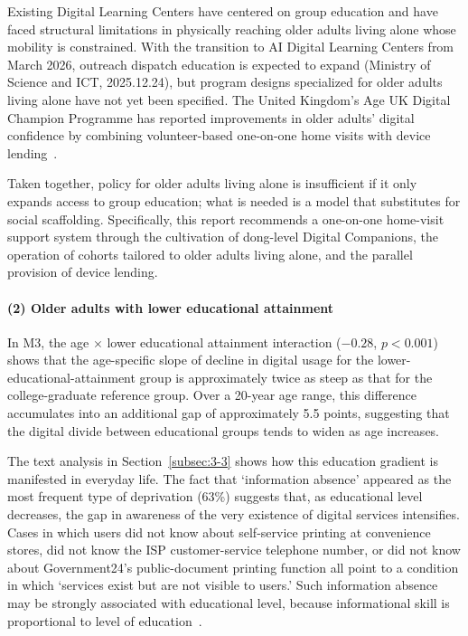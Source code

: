 Existing Digital Learning Centers have centered on group education and have faced structural limitations in physically reaching older adults living alone whose mobility is constrained. With the transition to AI Digital Learning Centers from March 2026, outreach dispatch education is expected to expand (Ministry of Science and ICT, 2025.12.24), but program designs specialized for older adults living alone have not yet been specified. The United Kingdom's Age UK Digital Champion Programme has reported improvements in older adults' digital confidence by combining volunteer-based one-on-one home visits with device lending~\citep{AgeUK2023}.

Taken together, policy for older adults living alone is insufficient if it only expands access to group education; what is needed is a model that substitutes for social scaffolding. Specifically, this report recommends a one-on-one home-visit support system through the cultivation of dong-level Digital Companions, the operation of cohorts tailored to older adults living alone, and the parallel provision of device lending.

\paragraph{(2) Older adults with lower educational attainment}

In M3, the age $\times$ lower educational attainment interaction ($-0.28$, $p < 0.001$) shows that the age-specific slope of decline in digital usage for the lower-educational-attainment group is approximately twice as steep as that for the college-graduate reference group. Over a 20-year age range, this difference accumulates into an additional gap of approximately 5.5 points, suggesting that the digital divide between educational groups tends to widen as age increases.

The text analysis in Section~\ref{subsec:3-3} shows how this education gradient is manifested in everyday life. The fact that `information absence' appeared as the most frequent type of deprivation (63\%) suggests that, as educational level decreases, the gap in awareness of the very existence of digital services intensifies. Cases in which users did not know about self-service printing at convenience stores, did not know the ISP customer-service telephone number, or did not know about Government24's public-document printing function all point to a condition in which `services exist but are not visible to users.' Such information absence may be strongly associated with educational level, because informational skill is proportional to level of education~\citep{Hargittai2010}.

